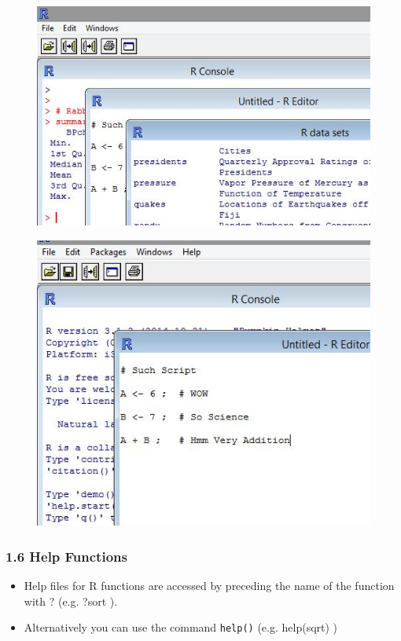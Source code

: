 \documentclass{beamer}
\begin{document}
 \begin{frame}
 	\begin{figure}
 		\centering
 		\includegraphics[width=0.7\linewidth]{images/Rmultiplewindows}
 	\end{figure}
 	
 \end{frame}   
 \begin{frame}
 	\begin{figure}
 		\centering
 		\includegraphics[width=0.7\linewidth]{images/Rscript}         
 	\end{figure}
 \end{frame}   
 \begin{frame}
 	
 	\frametitle{1.6 Help Functions}
 	\begin{itemize}
 		\item  Help files for R functions are accessed by preceding the name of the function with ? (e.g. ?sort
 		). 
 		
 		\item Alternatively you can use the command \texttt{help()} (e.g. help(sqrt) )
 	\end{itemize}
 	
 \end{frame}
\end{document}
